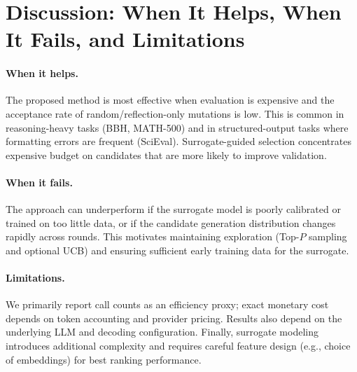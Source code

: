 \section{Discussion: When It Helps, When It Fails, and Limitations}
\paragraph{When it helps.}
The proposed method is most effective when evaluation is expensive and the acceptance rate of random/reflection-only mutations is low. This is common in reasoning-heavy tasks (BBH, MATH-500) and in structured-output tasks where formatting errors are frequent (SciEval). Surrogate-guided selection concentrates expensive budget on candidates that are more likely to improve validation.

\paragraph{When it fails.}
The approach can underperform if the surrogate model is poorly calibrated or trained on too little data, or if the candidate generation distribution changes rapidly across rounds. This motivates maintaining exploration (Top-$P$ sampling and optional UCB) and ensuring sufficient early training data for the surrogate.

\paragraph{Limitations.}
We primarily report call counts as an efficiency proxy; exact monetary cost depends on token accounting and provider pricing. Results also depend on the underlying LLM and decoding configuration. Finally, surrogate modeling introduces additional complexity and requires careful feature design (e.g., choice of embeddings) for best ranking performance.
